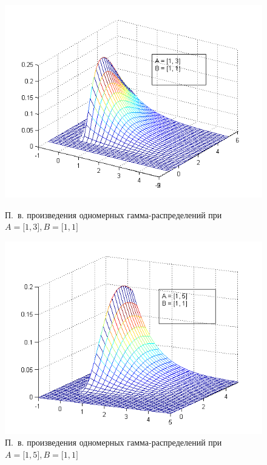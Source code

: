 \newpage

\begin{figure}[h!]
  \begin{minipage}[h!]{0.47\linewidth}
    \includegraphics[width=1\linewidth]{pic/new/gamma_mesh_5}
    \caption{П.~в. произведения одномерных гамма-распределений при 
      $ A = \big[1, 3\big], B = \big[ 1, 1 \big] $}
  \end{minipage}
  \hfill
  \begin{minipage}[h!]{0.47\linewidth}
    \vspace{4mm}
    \includegraphics[width=1\linewidth]{pic/new/gamma_mesh_6}
    \caption{П.~в. произведения одномерных гамма-распределений при
      $ A = \big[1, 5\big], B = \big[ 1, 1 \big] $}
  \end{minipage}
\end{figure}


